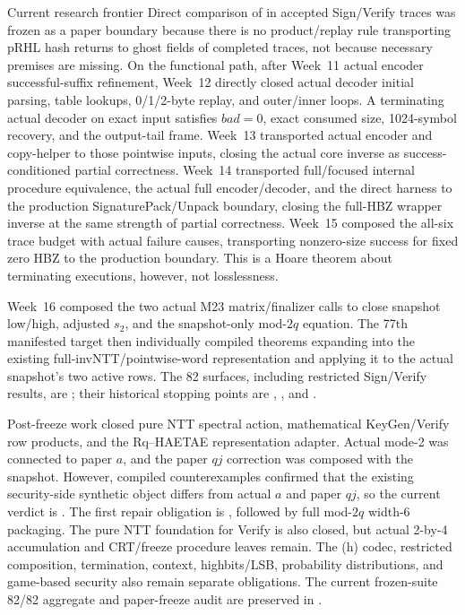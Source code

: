 \begin{takeaway}{Current research frontier}
Direct comparison of  in accepted Sign/Verify traces was
frozen as a paper boundary because there is no product/replay rule transporting
pRHL hash returns to ghost fields of completed traces, not because necessary
premises are missing. On the functional path, after Week~11 actual encoder
successful-suffix refinement, Week~12 directly closed actual decoder initial
parsing, table lookups, 0/1/2-byte replay, and outer/inner loops. A terminating
actual decoder on exact  input satisfies \(bad=0\),
exact consumed size, 1024-symbol recovery, and the output-tail frame. Week~13
transported actual encoder  and copy-helper
 to those pointwise inputs, closing the actual core inverse
as success-conditioned partial correctness. Week~14 transported full/focused
internal procedure equivalence, the actual full encoder/decoder, and the direct
harness to the production SignaturePack/Unpack boundary, closing the full-HBZ
wrapper inverse at the same strength of partial correctness. Week~15 composed
the all-six trace budget with actual failure causes, transporting nonzero-size
success for fixed zero HBZ to the production boundary. This is a Hoare theorem
about terminating executions, however, not losslessness.

Week~16 composed the two actual M23 matrix/finalizer calls to close snapshot
low/high, adjusted \(s_2\), and the snapshot-only mod-\(2q\) equation. The 77th
manifested target then individually compiled theorems expanding
 into the existing full-invNTT/pointwise-word representation
and applying it to the actual snapshot's two active rows. The 82 surfaces,
including restricted Sign/Verify results, are ; their
historical stopping points are ,
, and .

Post-freeze work closed pure NTT spectral action, mathematical KeyGen/Verify row
products, and the Rq--HAETAE representation adapter. Actual mode-2
 was connected to paper \(a\), and the paper \(qj\) correction
was composed with the snapshot. However, compiled counterexamples confirmed that
the existing security-side synthetic object differs from actual \(a\) and paper
\(qj\), so the current verdict is . The first repair
obligation is \allowbreak
{}, followed by full mod-\(2q\) width-6 packaging.
The pure NTT foundation for Verify is also closed, but actual 2-by-4 accumulation
and CRT/freeze procedure leaves remain. The (h) codec, restricted composition,
termination, context, highbits/LSB, probability distributions, and game-based
security also remain separate obligations. The current frozen-suite 82/82
aggregate and paper-freeze audit are preserved in
.
\end{takeaway}
